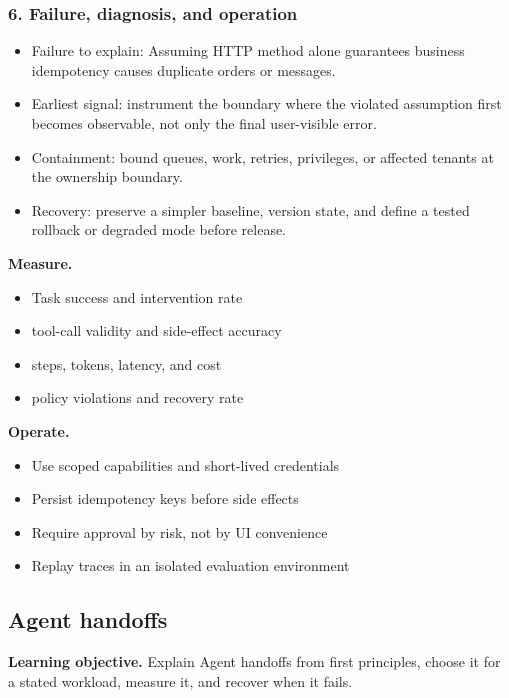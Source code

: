 \subsubsection*{6. Failure, diagnosis, and operation}
\begin{itemize}
\item Failure to explain: Assuming HTTP method alone guarantees business idempotency causes duplicate orders or messages.
\item Earliest signal: instrument the boundary where the violated assumption first becomes observable, not only the final user-visible error.
\item Containment: bound queues, work, retries, privileges, or affected tenants at the ownership boundary.
\item Recovery: preserve a simpler baseline, version state, and define a tested rollback or degraded mode before release.
\end{itemize}
\textbf{Measure.}\begin{itemize}
\item Task success and intervention rate
\item tool-call validity and side-effect accuracy
\item steps, tokens, latency, and cost
\item policy violations and recovery rate
\end{itemize}
\textbf{Operate.}\begin{itemize}
\item Use scoped capabilities and short-lived credentials
\item Persist idempotency keys before side effects
\item Require approval by risk, not by UI convenience
\item Replay traces in an isolated evaluation environment
\end{itemize}
\subsection{Agent handoffs}
\textbf{Learning objective.} Explain Agent handoffs from first principles, choose it for a stated workload, measure it, and recover when it fails.
